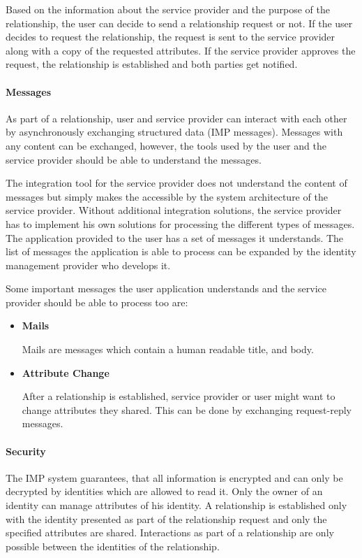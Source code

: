 Based on the information about the service provider and the purpose of the relationship, the user can decide to send a relationship request or not. If the user decides to request the relationship, the request is sent to the service provider along with a copy of the requested attributes. If the service provider approves the request, the relationship is established and both parties get notified.

\paragraph{Messages} As part of a relationship, user and service provider can interact with each other by asynchronously exchanging structured data (IMP messages). Messages with any content can be exchanged, however, the tools used by the user and the service provider should be able to understand the messages.

The integration tool for the service provider does not understand the content of messages but simply makes the accessible by the system architecture of the service provider. Without additional integration solutions, the service provider has to implement his own solutions for processing the different types of messages. The application provided to the user has a set of messages it understands. The list of messages the application is able to process can be expanded by the identity management provider who develops it.

Some important messages the user application understands and the service provider should be able to process too are:

\begin{itemize}
    \item \textbf{Mails}
    
    Mails are messages which contain a human readable title, and body.
    
    \item \textbf{Attribute Change}
    
    After a relationship is established, service provider or user might want to change attributes they shared. This can be done by exchanging request-reply messages.
\end{itemize}

\paragraph{Security}
The IMP system guarantees, that all information is encrypted and can only be decrypted by identities which are allowed to read it. Only the owner of an identity can manage attributes of his identity. A relationship is established only with the identity presented as part of the relationship request and only the specified attributes are shared. Interactions as part of a relationship are only possible between the identities of the relationship. 

